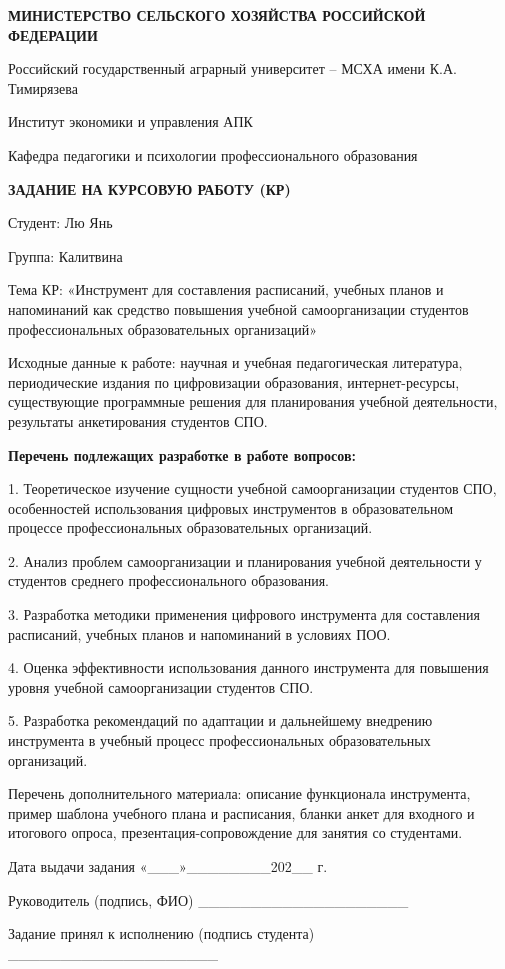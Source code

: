\documentclass[
]{article}
\begin{document}
\textbf{МИНИСТЕРСТВО СЕЛЬСКОГО ХОЗЯЙСТВА РОССИЙСКОЙ ФЕДЕРАЦИИ}

Российский государственный аграрный университет -- МСХА имени К.А.
Тимирязева

Институт экономики и управления АПК

Кафедра педагогики и психологии профессионального образования

\textbf{ЗАДАНИЕ НА КУРСОВУЮ РАБОТУ (КР)}

Студент: Лю Янь

Группа: Калитвина

Тема КР: «Инструмент для составления расписаний, учебных планов и
напоминаний как средство повышения учебной самоорганизации студентов
профессиональных образовательных организаций»

Исходные данные к работе: научная и учебная педагогическая литература,
периодические издания по цифровизации образования, интернет-ресурсы,
существующие программные решения для планирования учебной деятельности,
результаты анкетирования студентов СПО.

\textbf{Перечень подлежащих разработке в работе вопросов:}

1. Теоретическое изучение сущности учебной самоорганизации студентов
СПО, особенностей использования цифровых инструментов в образовательном
процессе профессиональных образовательных организаций.

2. Анализ проблем самоорганизации и планирования учебной деятельности у
студентов среднего профессионального образования.

3. Разработка методики применения цифрового инструмента для составления
расписаний, учебных планов и напоминаний в условиях ПОО.

4. Оценка эффективности использования данного инструмента для повышения
уровня учебной самоорганизации студентов СПО.

5. Разработка рекомендаций по адаптации и дальнейшему внедрению
инструмента в учебный процесс профессиональных образовательных
организаций.

Перечень дополнительного материала: описание функционала инструмента,
пример шаблона учебного плана и расписания, бланки анкет для входного и
итогового опроса, презентация-сопровождение для занятия со студентами.

Дата выдачи задания «\_\_\_»\_\_\_\_\_\_\_\_202\_\_ г.

Руководитель (подпись, ФИО) \_\_\_\_\_\_\_\_\_\_\_\_\_\_\_\_\_\_\_\_

Задание принял к исполнению (подпись студента)
\_\_\_\_\_\_\_\_\_\_\_\_\_\_\_\_\_\_\_\_
\end{document}

